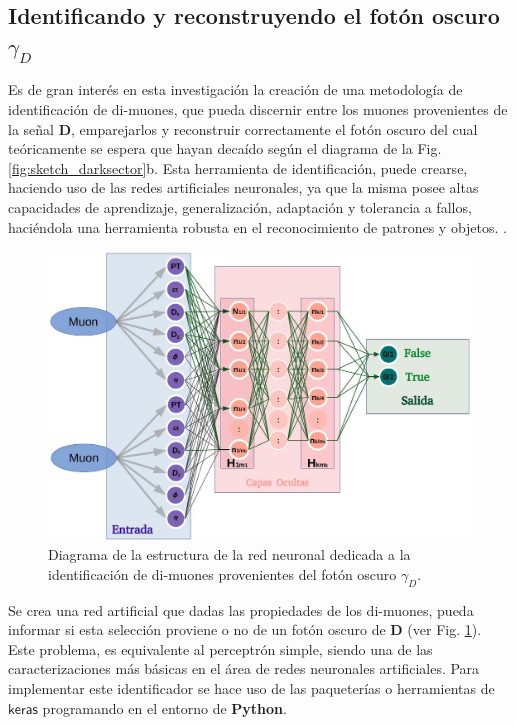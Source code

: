 \subsection{Identificando y reconstruyendo el fotón oscuro $\gamma_D$}

Es de gran interés en esta investigación la creación de una metodología de identificación de di-muones, que pueda discernir entre los muones provenientes de la señal \MSSM\textbf{D}, emparejarlos y reconstruir correctamente el fotón oscuro del cual teóricamente se espera que hayan decaído según el diagrama de la Fig. \ref{fig:sketch_darksector}b. Esta herramienta de identificación, puede crearse, haciendo uso de las redes artificiales neuronales, ya que la misma posee altas capacidades de aprendizaje, generalización, adaptación y tolerancia a fallos, haciéndola una herramienta robusta en el reconocimiento de patrones y objetos.     .

\begin{figure}[!h]
\centering
\includegraphics[width=.9\textwidth]{Simulacion/imagenes/IDENTIFICADOR.png}
\caption{Diagrama de la estructura de la red neuronal dedicada a la identificación de di-muones provenientes del fotón oscuro $\gamma_D$.}
\label{identificador}
\end{figure}

Se crea una red artificial que dadas las propiedades de los di-muones, pueda informar si esta selección proviene o no de un fotón oscuro de \MSSM\textbf{D} (ver Fig. \ref{identificador}). Este problema, es equivalente al perceptrón simple, siendo una de las caracterizaciones más básicas en el área de redes neuronales artificiales.
Para implementar este identificador se hace uso de las paqueterías o herramientas de $\textsf{keras}$ programando en el entorno de \textbf{Python}.

